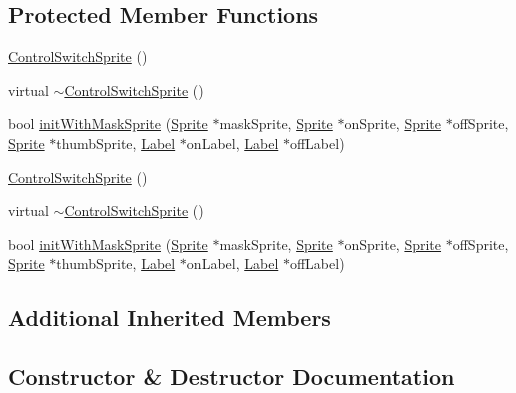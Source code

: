 \subsection*{Protected Member Functions}
\begin{DoxyCompactItemize}
\item 
\hyperlink{classControlSwitchSprite_a853766cecef18be89e97f999ad2c1c04}{Control\+Switch\+Sprite} ()
\item 
virtual \hyperlink{classControlSwitchSprite_a338f31a606d54213f65d05fd6d1e5824}{$\sim$\+Control\+Switch\+Sprite} ()
\item 
bool \hyperlink{classControlSwitchSprite_a154e78b91ffa77afad7a302f728f1a83}{init\+With\+Mask\+Sprite} (\hyperlink{classSprite}{Sprite} $\ast$mask\+Sprite, \hyperlink{classSprite}{Sprite} $\ast$on\+Sprite, \hyperlink{classSprite}{Sprite} $\ast$off\+Sprite, \hyperlink{classSprite}{Sprite} $\ast$thumb\+Sprite, \hyperlink{classLabel}{Label} $\ast$on\+Label, \hyperlink{classLabel}{Label} $\ast$off\+Label)
\item 
\hyperlink{classControlSwitchSprite_a853766cecef18be89e97f999ad2c1c04}{Control\+Switch\+Sprite} ()
\item 
virtual \hyperlink{classControlSwitchSprite_a74532e265961ec91ab495a0c2c78a81d}{$\sim$\+Control\+Switch\+Sprite} ()
\item 
bool \hyperlink{classControlSwitchSprite_a154e78b91ffa77afad7a302f728f1a83}{init\+With\+Mask\+Sprite} (\hyperlink{classSprite}{Sprite} $\ast$mask\+Sprite, \hyperlink{classSprite}{Sprite} $\ast$on\+Sprite, \hyperlink{classSprite}{Sprite} $\ast$off\+Sprite, \hyperlink{classSprite}{Sprite} $\ast$thumb\+Sprite, \hyperlink{classLabel}{Label} $\ast$on\+Label, \hyperlink{classLabel}{Label} $\ast$off\+Label)
\end{DoxyCompactItemize}
\subsection*{Additional Inherited Members}


\subsection{Constructor \& Destructor Documentation}
\mbox{\label{classControlSwitchSprite_a853766cecef18be89e97f999ad2c1c04}} 
